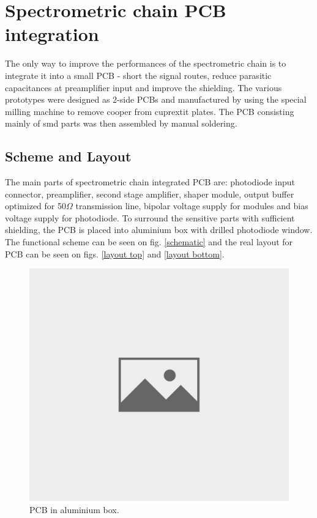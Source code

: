 \chapter{Spectrometric chain PCB integration}
The only way to improve the performances of the spectrometric chain is to integrate it into a small PCB - short the signal routes, reduce parasitic capacitances at preamplifier input and improve the shielding. The various prototypes were designed as 2-side PCBs and manufactured by using the special milling machine to remove cooper from cuprextit plates. The PCB consisting mainly of smd parts was then assembled by manual soldering.

\section{Scheme and Layout}
The main parts of spectrometric chain integrated PCB are: photodiode input connector, preamplifier, second stage amplifier, shaper module, output buffer optimized for 50\nobreakspace$\Omega$ transmission line, bipolar voltage supply for modules and bias voltage supply for photodiode. To surround the sensitive parts with sufficient shielding, the PCB is placed into aluminium box with drilled photodiode window. The functional scheme can be seen on fig. \ref{schematic} and the real layout for PCB can be seen on figs. \ref{layout top} and \ref{layout bottom}.



\begin{figure}[H]
 \centering
 \includegraphics[scale=0.35, angle = 0]{./pictures/NoPicture.jpg}
 \caption{PCB in aluminium box.}
 \label{PCBbox}
 
\end{figure}


